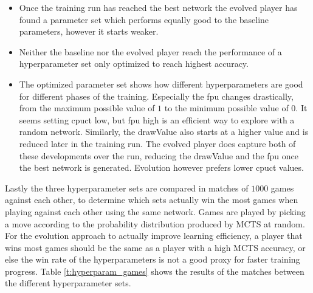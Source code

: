 \documentclass[12pt,onecolumn,oneside,titlepage]{article}
\begin{document}
\begin{itemize}
 \item Once the training run has reached the best network the evolved player has found a parameter set which performs equally good to the baseline parameters, however it starts weaker.
 \item Neither the baseline nor the evolved player reach the performance of a hyperparameter set only optimized to reach highest accuracy.
 \item The optimized parameter set shows how different hyperparameters are good for different phases of the training. Especially the fpu changes drastically, from the maximum possible value of $1$ to the minimum possible value of $0$. It seems
 setting cpuct low, but fpu high is an efficient way to explore with a random network. Similarly, the drawValue also starts at a higher value and is reduced later in the training run. The evolved player does capture both of these developments over the run,
 reducing the drawValue and the fpu once the best network is generated. Evolution however prefers lower cpuct values.
\end{itemize}


Lastly the three hyperparameter sets are compared in matches of $1000$ games against each other, to determine which sets actually win the most games when playing against each other using the same network. Games are played by picking a move according
to the probability distribution produced by MCTS at random.
For the evolution approach to actually improve learning efficiency, a player that wins most games should be the same as a player with a high MCTS accuracy, or else the win rate of the hyperparameters is not a good proxy for faster training progress.
Table \ref{t:hyperparam_games} shows the results of the matches between the different hyperparameter sets.
\end{document}
